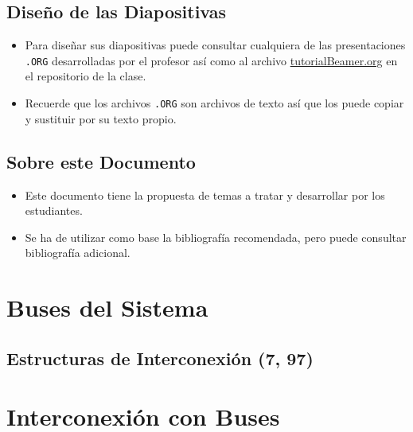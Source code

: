 \documentclass[presentation]{beamer}
\begin{document}
\subsection{Diseño de las Diapositivas}
\label{sec:orgc9ae8cc}
\begin{itemize}
\item Para diseñar sus diapositivas puede consultar cualquiera de las
presentaciones \texttt{.ORG} desarrolladas por el profesor así como al
archivo \href{https://github.com/LeninGF/EPN-Lectures/blob/main/iccd332ArqComp-2024-B/Tutoriales/Beamer-Emacs/tutorialBeamer.org}{tutorialBeamer.org} en el repositorio de la clase.
\item Recuerde que los archivos \texttt{.ORG} son archivos de texto así que los
puede copiar y sustituir por su texto propio.
\end{itemize}
\subsection{Sobre este Documento}
\label{sec:orgd27a5c7}
\begin{itemize}
\item Este documento tiene la propuesta de temas a tratar y desarrollar
por los estudiantes.
\item Se ha de utilizar como base la bibliografía recomendada, pero puede
consultar bibliografía adicional.
\end{itemize}
\section{Buses del Sistema}
\label{sec:org6a69aef}
\subsection{Estructuras de Interconexión (7, 97)}
\label{sec:org54d0926}
\section{Interconexión con Buses}
\label{sec:org661e7b8}
\end{document}
